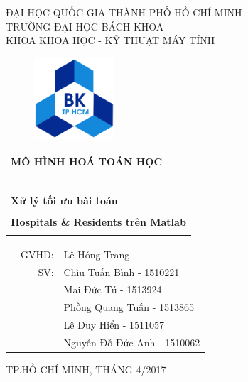 \documentclass[a4paper]{report}
\begin{document}
\begin{titlepage}
\begin{center}
ĐẠI HỌC QUỐC GIA THÀNH PHỐ HỒ CHÍ MINH \\
TRƯỜNG ĐẠI HỌC BÁCH KHOA \\
KHOA KHOA HỌC - KỸ THUẬT MÁY TÍNH 
\end{center}

\vspace{1cm}

\begin{figure}[h!]
\begin{center}
\includegraphics[width=3cm]{hcmut.png}
\end{center}
\end{figure}

\vspace{1cm}


\begin{center}
\begin{tabular}{c}
	\multicolumn{1}{l}{\textbf{{\Large MÔ HÌNH HOÁ TOÁN HỌC}}}\\
	~~\\
	\hline
	\\
	\multicolumn{1}{l}{\textbf{{\Large Xử lý tối ưu bài toán}}}\\
	\\
	
	\textbf{{\Huge Hospitals \& Residents trên Matlab}}\\
	\\
	\hline
\end{tabular}
\end{center}

\vspace{3cm}

\begin{table}[h]
\begin{tabular}{rrl}
\hspace{5 cm} & GVHD: &Lê Hồng Trang\\
& SV: & Chìu Tuấn Bình - 1510221\\
& & Mai Đức Tú - 1513924 \\
& & Phồng Quang Tuấn - 1513865\\
& & Lê Duy Hiển - 1511057 \\
& & Nguyễn Đỗ Đức Anh - 1510062\\
\end{tabular}
\end{table}

\begin{center}
{\footnotesize TP.HỒ CHÍ MINH, THÁNG 4/2017}
\end{center}
\end{titlepage}
\end{document}
